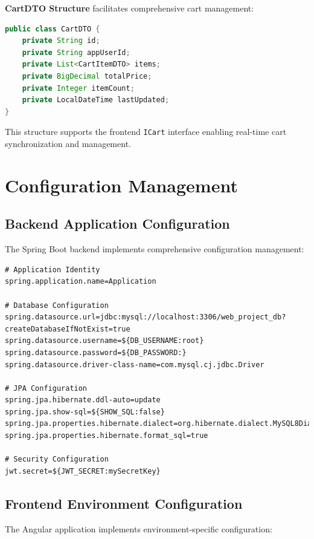 \documentclass[12pt,a4paper]{article}
\begin{document}
\textbf{CartDTO Structure} facilitates comprehensive cart management:

\begin{lstlisting}[language=java,caption=CartDTO Structure]
public class CartDTO {
    private String id;
    private String appUserId;
    private List<CartItemDTO> items;
    private BigDecimal totalPrice;
    private Integer itemCount;
    private LocalDateTime lastUpdated;
}
\end{lstlisting}

This structure supports the frontend \texttt{ICart} interface enabling real-time cart synchronization and management.

\section{Configuration Management}

\subsection{Backend Application Configuration}

The Spring Boot backend implements comprehensive configuration management:

\begin{lstlisting}[language=properties,caption=Backend Application Configuration]
# Application Identity
spring.application.name=Application

# Database Configuration
spring.datasource.url=jdbc:mysql://localhost:3306/web_project_db?createDatabaseIfNotExist=true
spring.datasource.username=${DB_USERNAME:root}
spring.datasource.password=${DB_PASSWORD:}
spring.datasource.driver-class-name=com.mysql.cj.jdbc.Driver

# JPA Configuration
spring.jpa.hibernate.ddl-auto=update
spring.jpa.show-sql=${SHOW_SQL:false}
spring.jpa.properties.hibernate.dialect=org.hibernate.dialect.MySQL8Dialect
spring.jpa.properties.hibernate.format_sql=true

# Security Configuration
jwt.secret=${JWT_SECRET:mySecretKey}
\end{lstlisting}

\subsection{Frontend Environment Configuration}

The Angular application implements environment-specific configuration:
\end{document}
